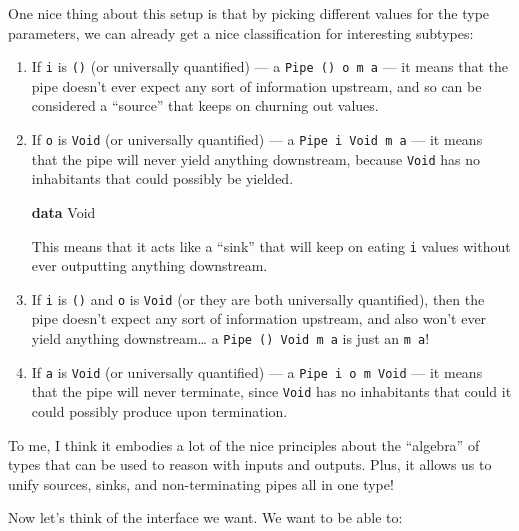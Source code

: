 \documentclass[]{article}
\newenvironment{Shaded}{}{}
\newcommand{\DataTypeTok}[1]{\textcolor[rgb]{0.56,0.13,0.00}{#1}}
\newcommand{\KeywordTok}[1]{\textcolor[rgb]{0.00,0.44,0.13}{\textbf{#1}}}
\begin{document}
One nice thing about this setup is that by picking different values for the type
parameters, we can already get a nice classification for interesting subtypes:

\begin{enumerate}
\def\labelenumi{\arabic{enumi}.}
\item
  If \texttt{i} is \texttt{()} (or universally quantified) --- a
  \texttt{Pipe\ ()\ o\ m\ a} --- it means that the pipe doesn't ever expect any
  sort of information upstream, and so can be considered a ``source'' that keeps
  on churning out values.
\item
  If \texttt{o} is \texttt{Void} (or universally quantified) --- a
  \texttt{Pipe\ i\ Void\ m\ a} --- it means that the pipe will never yield
  anything downstream, because \texttt{Void} has no inhabitants that could
  possibly be yielded.

\begin{Shaded}
\begin{Highlighting}[]
\KeywordTok{data} \DataTypeTok{Void}
\end{Highlighting}
\end{Shaded}

  This means that it acts like a ``sink'' that will keep on eating \texttt{i}
  values without ever outputting anything downstream.
\item
  If \texttt{i} is \texttt{()} and \texttt{o} is \texttt{Void} (or they are both
  universally quantified), then the pipe doesn't expect any sort of information
  upstream, and also won't ever yield anything downstream\ldots{} a
  \texttt{Pipe\ ()\ Void\ m\ a} is just an \texttt{m\ a}!
\item
  If \texttt{a} is \texttt{Void} (or universally quantified) --- a
  \texttt{Pipe\ i\ o\ m\ Void} --- it means that the pipe will never terminate,
  since \texttt{Void} has no inhabitants that could it could possibly produce
  upon termination.
\end{enumerate}

To me, I think it embodies a lot of the nice principles about the ``algebra'' of
types that can be used to reason with inputs and outputs. Plus, it allows us to
unify sources, sinks, and non-terminating pipes all in one type!

Now let's think of the interface we want. We want to be able to:
\end{document}
